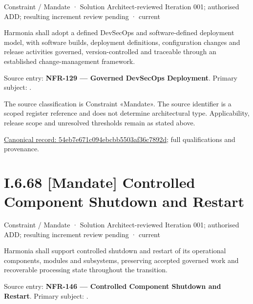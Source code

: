 \label{element:54eb7e671c094ebcbb5503af36c7892d}
{\small Constraint / Mandate · Solution Architect-reviewed Iteration 001; authorised ADD; resulting increment review pending · current}\par

Harmonia shall adopt a defined DevSecOps and software-defined deployment model, with software builds, deployment definitions, configuration changes and release activities governed, version-controlled and traceable through an established change-management framework.



Source entry: \textbf{NFR-129 — Governed DevSecOps Deployment}. Primary subject: \texttt{}.



The source classification is Constraint «Mandate». The source identifier is a scoped register reference and does not determine architectural type. Applicability, release scope and unresolved thresholds remain as stated above.


{\footnotesize \href{../../../../../../../continuum/motivation/constraint/mandate/54eb7e671c094ebcbb5503af36c7892d.md}{Canonical record: 54eb7e671c094ebcbb5503af36c7892d}; full qualifications and provenance.}\par
\section*{I.6.68 [Mandate] Controlled Component Shutdown and Restart}
\label{navigation:I.6.68}

\label{element:96f7bfa320b049d2b76fcc35a1926883}
{\small Constraint / Mandate · Solution Architect-reviewed Iteration 001; authorised ADD; resulting increment review pending · current}\par

Harmonia shall support controlled shutdown and restart of its operational components, modules and subsystems, preserving accepted governed work and recoverable processing state throughout the transition.



Source entry: \textbf{NFR-146 — Controlled Component Shutdown and Restart}. Primary subject: \texttt{}.




